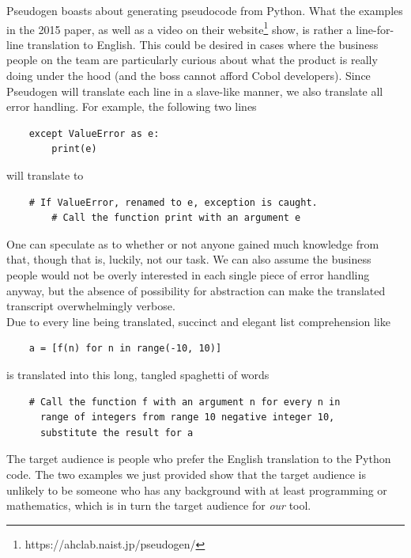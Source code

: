 Pseudogen boasts about generating pseudocode from Python. What the examples in the 2015 paper, as well as a video on their website\footnote{https://ahclab.naist.jp/pseudogen/} show, is rather a line-for-line translation to English. This could be desired in cases where the business people on the team are particularly curious about what the product is really doing under the hood (and the boss cannot afford Cobol developers). Since Pseudogen will translate each line in a slave-like manner, we also translate all error handling. For example, the following two lines

\begin{verbatim}
    except ValueError as e:
        print(e)
\end{verbatim}

will translate to

\begin{verbatim}
    # If ValueError, renamed to e, exception is caught.
        # Call the function print with an argument e
\end{verbatim}

One can speculate as to whether or not anyone gained much knowledge from that, though that is, luckily, not our task. We can also assume the business people would not be overly interested in each single piece of error handling anyway, but the absence of possibility for abstraction can make the translated transcript overwhelmingly verbose. \hfill \\

Due to every line being translated, succinct and elegant list comprehension like

\begin{verbatim}
    a = [f(n) for n in range(-10, 10)]
\end{verbatim}

is translated into this long, tangled spaghetti of words

\begin{verbatim}
    # Call the function f with an argument n for every n in
      range of integers from range 10 negative integer 10,
      substitute the result for a
\end{verbatim}

The target audience is people who prefer the English translation to the Python code. The two examples we just provided show that the target audience is unlikely to be someone who has any background with at least programming or mathematics, which is in turn the target audience for \textit{our} tool. \hfill \\


